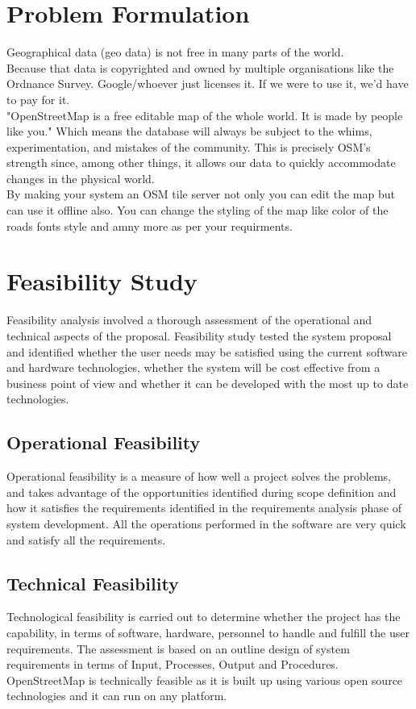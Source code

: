 \section{Problem Formulation}
Geographical data (geo data) is not free in many parts of the world.\\
Because that data is copyrighted and owned by multiple organisations like the Ordnance Survey. Google/whoever just licenses it. If we were to use it, we'd have to pay for it. \\
\noindent "OpenStreetMap is a free editable map of the whole world. It is made by people like you." Which means the database will always be subject to the whims, experimentation, and mistakes of the community. This is precisely OSM's strength since, among other things, it allows our data to quickly accommodate changes in the physical world.\\
\noindent By making your system an OSM tile server not only you can edit the map but can use it offline also. You can change the styling of the map like color of the roads fonts style and amny more as per your requirments. 

\section{Feasibility Study}
\noindent Feasibility analysis involved a thorough assessment of the operational and technical aspects of the proposal.
Feasibility study tested the system proposal and identified whether the user needs may be satisfied using
the current software and hardware technologies, whether the system will be cost effective from a business
point of view and whether it can be developed with the most up to date technologies.
\subsection{Operational Feasibility}
\noindent Operational feasibility is a measure of how well a project solves the problems, and takes advantage of
the opportunities identified during scope definition and how it satisfies the requirements identified in
the requirements analysis phase of system development. All the operations performed in the software
are very quick and satisfy all the requirements.
\subsection{Technical Feasibility}
\noindent Technological feasibility is carried out to determine whether the project has the capability, in terms
of software, hardware, personnel to handle and fulfill the user requirements. The assessment is based
on an outline design of system requirements in terms of Input, Processes, Output and Procedures.
OpenStreetMap is technically feasible as it is built up using various open source technologies and it can run on any platform.
